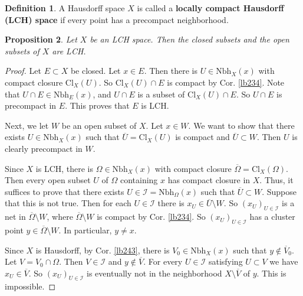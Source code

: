\documentclass[12pt,b5paper,notitlepage]{article}
\theoremstyle{definition}
\newtheorem{df}{Definition}[section]
\theoremstyle{plain}
\newtheorem{pp}[df]{Proposition}
\newcommand{\mc}{\mathcal}
\newcommand{\ovl}{\overline}
\newcommand{\Nbh}{\mathrm{Nbh}}
\newcommand{\Cl}{\mathrm{Cl}}
\numberwithin{equation}{section}
\begin{document}
\begin{df}
A Hausdorff space $X$ is called a \textbf{locally compact Hausdorff (LCH) space}  if every point has a precompact neighborhood.
\end{df}






\begin{pp}\label{lb245}
Let $X$ be an LCH space. Then the closed subsets and the open subsets of $X$ are LCH. 
\end{pp}

\begin{proof}
Let $E\subset X$ be closed. Let $x\in E$. Then there is $U\in\Nbh_X(x)$ with compact closure $\Cl_X(U)$. So $\Cl_X(U)\cap E$ is compact by Cor. \ref{lb234}. Note that $U\cap E\in \Nbh_E(x)$, and $U\cap E$ is a subset of $\Cl_X(U)\cap E$. So $U\cap E$ is precompact in $E$. This proves that $E$ is LCH.

Next, we let $W$ be an open subset of $X$. Let $x\in W$. We want to show that there exists $U\in\Nbh_X(x)$ such that $\ovl U=\Cl_X(U)$ is compact and $\ovl U\subset W$. Then $U$ is clearly precompact in $W$.

Since $X$ is LCH, there is $\Omega\in\Nbh_X(x)$ with compact closure $\ovl\Omega=\Cl_X(\Omega)$. Then every open subset $U$ of $\Omega$ containing $x$ has compact closure in $X$. Thus, it suffices to prove that there exists $U\in\mc I=\Nbh_\Omega(x)$  such that $\ovl U\subset W$. Suppose that this is not true. Then for each $U\in\mc I$ there is $x_U\in \ovl U\setminus W$. So $(x_U)_{U\in\mc I}$ is a net in $\ovl\Omega\setminus W$, where $\ovl\Omega\setminus W$ is compact by Cor. \ref{lb234}. So $(x_U)_{U\in\mc I}$ has a cluster point $y\in\ovl\Omega\setminus W$. In particular, $y\neq x$.

Since $X$ is Hausdorff, by Cor. \ref{lb243}, there is $V_0\in\Nbh_X(x)$ such that $y\notin\ovl V_0$. Let $V=V_0\cap\Omega$. Then $V\in\mc I$ and $y\notin \ovl V$. For every $U\in\mc I$ satisfying $U\subset V$ we have $x_U\in\ovl V$. So $(x_U)_{U\in\mc I}$ is eventually not in the neighborhood $X\setminus \ovl V$ of $y$. This is impossible.
\end{proof}
\end{document}
